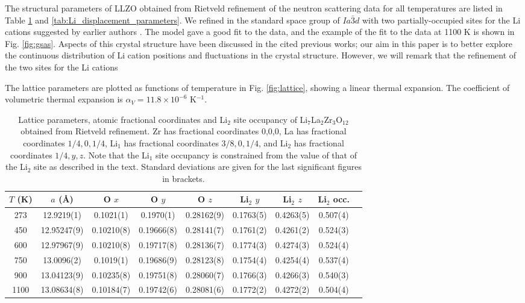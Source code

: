 \documentclass[twoside,twocolumn,9pt]{article}
\begin{document}
The structural parameters of LLZO obtained from Rietveld refinement of the neutron scattering data for all temperatures are listed in Table \ref{tab:Rietveld_structure} and \ref{tab:Li_displacement_parameters}. We refined in the standard space group of $Ia\bar{3}d$ with two partially-occupied sites for the Li cations suggested by earlier authors  \cite{Awaka:2009jv,Buschmann:2011jo,Geiger:2011cg, Awaka:2011il, DanielRettenwander:2016ei,Wagner:2016bh,Kataoka:2019go, Xie:2011gv,Han:2012is,Li:2012fz,Wang:2014ic}. The model gave a good fit to the data, and the example of the fit to the data at 1100 K is shown in Fig. \ref{fig:gsas}.  Aspects of this crystal structure have been discussed in the cited previous works; our aim in this paper is to better explore the continuous distribution of Li cation positions and fluctuations in the crystal structure. However, we will remark that the refinement of the two sites for the Li cations

The lattice parameters are plotted as functions of temperature in Fig. \ref{fig:lattice}, showing a linear thermal expansion. The coefficient of volumetric thermal expansion is $\alpha_V = 11.8 \times 10^{-6}$ K$^{-1}$.

\begin{table}[t]
\centering
\caption{Lattice parameters, atomic fractional coordinates and Li$_2$ site occupancy of Li$_7$La$_2$Zr$_3$O$_{12}$ obtained from Rietveld refinement. Zr has fractional coordinates 0,0,0, La has fractional coordinates $1/4,0,1/4$, Li$_1$ has fractional coordinates $3/8,0,1/4$, and Li$_2$ has fractional coordinates $1/4,y,z$. Note that the Li$_1$ site occupancy is constrained from the value of that of the Li$_2$ site as described in the text. Standard deviations are given for the last significant figures in brackets. }
\label{tab:Rietveld_structure}
\begin{tabular}{ccccccccc}
\hline
\hline
$T$ (K)  & $a$ (\AA) & O $x$        & O $y$        & O $z$        &  Li$_2$ $y$       & Li$_2$ $z$ & Li$_2$ occ. \\
\hline
273  & 12.9219(1)    & 0.1021(1)      & 0.1970(1)      & 0.28162(9)     & 0.1763(5)           & 0.4263(5)    & 0.507(4) \\
450  & 12.95247(9)   & 0.10210(8)     & 0.19666(8)     & 0.28141(7)     & 0.1761(2)           & 0.4261(2)    & 0.524(3) \\
600  & 12.97967(9)   & 0.10210(8)     & 0.19717(8)     & 0.28136(7)     & 0.1774(3)           & 0.4274(3)    & 0.524(4) \\
750  & 13.0096(2)    & 0.1019(1)      & 0.19686(9)     & 0.28123(8)     & 0.1754(4)           & 0.4254(4)    & 0.537(4) \\
900  & 13.04123(9)   & 0.10235(8)     & 0.19751(8)     & 0.28060(7)     & 0.1766(3)           & 0.4266(3)    & 0.540(3) \\
1100 & 13.08634(8)   & 0.10184(7)     & 0.19742(6)     & 0.28081(6)     & 0.1772(2)           & 0.4272(2)    & 0.504(4) \\
\hline
\hline
\end{tabular}
\end{table}
\end{document}
